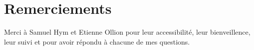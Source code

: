 \section*{Remerciements}

Merci à Samuel Hym et Etienne Ollion pour leur accessibilité, leur bienveillence, leur suivi et pour avoir répondu à chacune de mes questions.
